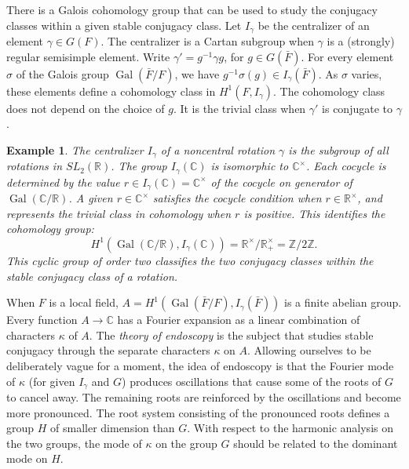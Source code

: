 \documentclass[brochure,english,12pt]{bourbaki}
\newtheorem{example}[equation]{Example}
\def\op#1{{\operatorname{#1}}}
\newcommand{\ring}[1]{\mathbb{#1}}
\begin{document}
There is a Galois cohomology group that can be used to study the conjugacy classes within
a given stable conjugacy class.  Let $I_\gamma$ be the centralizer of an element $\gamma\in G(F)$.
The centralizer is a Cartan subgroup when $\gamma$ is a (strongly) regular semisimple element.
Write $\gamma'=g^{-1}\gamma g$, for $g\in G(\bar F)$.
For every element $\sigma$ of the Galois group $\op{Gal}(\bar F/F)$,  we have
 $g^{-1}\sigma(g)\in I_\gamma(\bar F)$.  As $\sigma$ varies, these elements define a cohomology class in
$H^1(F,I_\gamma)$.  The cohomology class does not depend
on the choice of $g$.  It is the trivial class when
$\gamma'$ is conjugate to $\gamma$.


\begin{example} The centralizer $I_\gamma$ of a noncentral rotation $\gamma$ is  the subgroup of all
rotations in  $SL_2(\ring{R})$.  The group $I_\gamma(\ring{C})$ is isomorphic
  to $\ring{C}^\times$.   Each cocycle is determined by the value $r\in I_\gamma(\ring{C})=\ring{C}^\times$ 
   of the cocycle on generator of  $\op{Gal}(\ring{C}/\ring{R})$.  A given $r\in\ring{C}^\times$
satisfies the cocycle condition when $r\in \ring{R}^\times$,
  and represents the trivial class in cohomology when $r$ is positive.  This identifies the cohomology group:
\[
H^1(\op{Gal}(\ring{C}/\ring{R}),I_\gamma(\ring{C})) = \ring{R}^\times/\ring{R}^\times_+ = \ring{Z}/2\ring{Z}.
\]
 This cyclic group of order two classifies the two conjugacy classes within the stable conjugacy class
 of a rotation.
\end{example}

When $F$ is a local field, $A=H^1(\op{Gal}(\bar F/F),I_\gamma(\bar F))$ is a
finite abelian group.  Every function $A\to\ring{C}$  has a
Fourier expansion as a linear combination of characters $\kappa$ of
$A$.  
The {\it theory of endoscopy} is the subject that studies stable
conjugacy through the separate characters $\kappa$ on $A$.  Allowing
ourselves to be deliberately vague for a moment, the idea of endoscopy
is that the Fourier mode of $\kappa$ (for given $I_\gamma$ and $G$)
produces oscillations that cause some of the roots of $G$ to cancel
away.  The remaining roots are reinforced by the oscillations and
become more pronounced.  The root system consisting of the pronounced
roots defines a group $H$ of smaller dimension than $G$.  With respect
to the harmonic analysis on the two groups, the mode of $\kappa$ on
the group $G$ should be related to the dominant mode on $H$.
\end{document}
